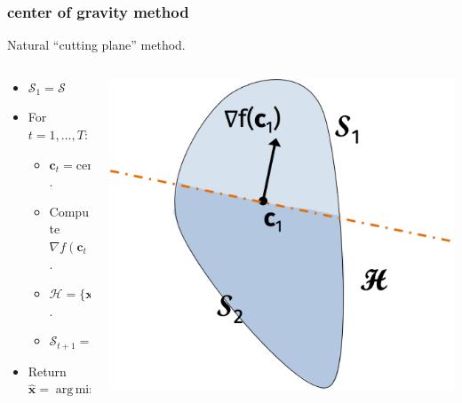 \documentclass[compress]{beamer}
\newcommand{\bv}[1]{\mathbf{#1}}
\DeclareMathOperator*{\argmin}{arg\,min}
\begin{document}
\begin{frame}[t]
	\frametitle{center of gravity method}
	\begin{center}
		Natural ``cutting plane'' method.
	\end{center}
	\begin{columns}
		\begin{column}{.6\textwidth}
			\begin{itemize}
				\item $\mathcal{S}_1 = \mathcal{S}$
				\item For $t = 1, \ldots, T:$
				\begin{itemize}
					\item $\bv{c}_t = \text{center of gravity of } \mathcal{S}_t$.
					\item {Compute $\nabla f(\bv{c}_t)$.}
					\item \alert{$\mathcal{H} = \{\bv{x} \big\vert \langle \nabla f(\bv{c}_t), \bv{x}-\bv{c}_t\rangle \leq 0\}$.}
					\item \alert{$\mathcal{S}_{t+1} = \mathcal{S}_{t} \cap H$}
				\end{itemize}
				\item Return $\hat{\mathbf{x}} = \argmin_t f(\bv{c}_t)$
			\end{itemize}
		\end{column}
		\begin{column}{.6\textwidth}
			\includegraphics[width=\textwidth]{cog3.png}
		\end{column}
	\end{columns}
\end{frame}
\end{document}
